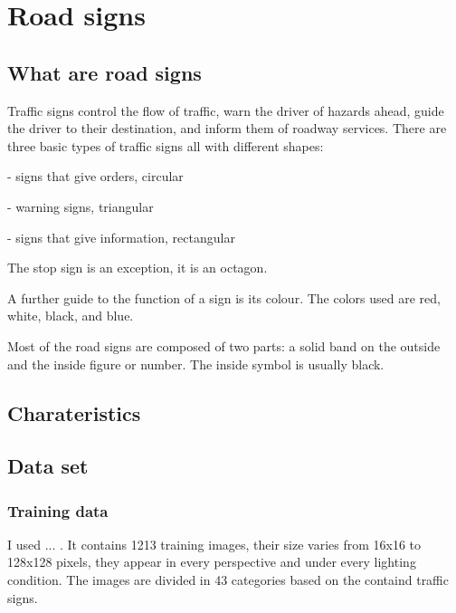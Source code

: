 \chapter{Road signs}\label{ch:SIGNS}

\section{What are road signs}\label{sec:SIGNS:whatAreThey}

Traffic signs control the flow of traffic, warn the driver of hazards ahead, guide the driver to their destination, and inform them of roadway services. There are three basic types of traffic signs all with different shapes: 

- signs that give orders, circular

- warning signs, triangular

- signs that give information, rectangular

The stop sign is an exception, it is an octagon.


A further guide to the function of a sign is its colour. The colors used are red, white, black, and blue. %

Most of the road signs are composed of two parts: a solid band on the outside and the inside figure or number. The inside symbol is usually black. 

\section{Charateristics}\label{sec:SIGNS:character}

\section{Data set}\label{sec:SIGNS:dataSet}

\subsection{Training data}

I used ... . It contains 1213 training images, their size varies from 16x16 to 128x128 pixels, they appear in every perspective and under every lighting condition. The images are divided in 43 categories based on the containd traffic signs.


